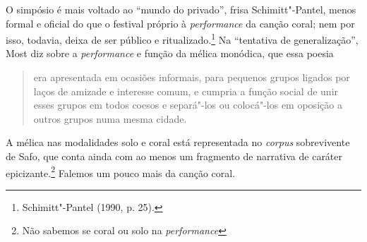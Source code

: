 O simpósio é mais voltado ao “mundo do privado”, frisa Schimitt"-Pantel, menos
formal e oficial do que o festival próprio à \textit{performance}
da canção coral; nem por isso, todavia, deixa de ser público e
ritualizado.\footnote{ Schimitt"-Pantel (1990, p. 25).} Na
“tentativa de generalização”, Most diz sobre a \textit{performance} e função da
mélica monódica, que essa poesia 

\begin{quote}
era apresentada em ocasiões informais, para
pequenos grupos ligados por laços de amizade e interesse comum, e cumpria a
função social de unir esses grupos em todos coesos e separá"-los ou colocá"-los
em oposição a outros grupos numa mesma cidade.
\end{quote}

A mélica nas modalidades solo e coral está representada no \textit{corpus} sobrevivente
de Safo, que conta ainda com ao menos um fragmento de narrativa de
caráter epicizante.\footnote{Não sabemos se coral ou solo na \textit{performance}} 
Falemos um pouco mais da canção coral.

